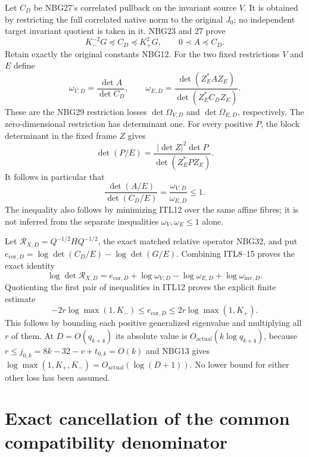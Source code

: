 \documentclass[11pt,a4paper]{article}
\begin{document}
Let $C_D$ be NBG27's correlated pullback on the invariant
source $V$. It is obtained by restricting the full correlated
native norm to the original $J_0$; no independent target
invariant quotient is taken in it. NBG23 and 27 prove
\[
 K_-^{-2}G\preceq C_D\preceq K_+^2G,\qquad
                       0\prec A\preceq C_D.       \tag{ITL12}
\]
Retain exactly the original constants NBG12. For the two
fixed restrictions $V$ and $E$ define
\[
 \omega_{V,D}=\frac{\det A}{\det C_D},\qquad
 \omega_{E,D}=\frac{\det(Z_E^*AZ_E)}
                        {\det(Z_E^*C_DZ_E)} .      \tag{ITL13}
\]
These are the NBG29 restriction losses $\det\Omega_{V,D}$
and $\det\Omega_{E,D}$, respectively. The zero-dimensional
restriction has determinant one.
For every positive $P$, the block determinant in the fixed
frame $Z$ gives
\[
 \det(P/E)=\frac{|\det Z|^2\det P}{\det(Z_E^*PZ_E)}.
                                                        \tag{ITL14}
\]
It follows in particular that
\[
 \frac{\det(A/E)}{\det(C_D/E)}
       =\frac{\omega_{V,D}}{\omega_{E,D}}\le1 .   \tag{ITL15}
\]
The inequality also follows by minimizing ITL12 over the
same affine fibres; it is not inferred from the separate
inequalities $\omega_V,\omega_E\le1$ alone.

Let $\mathscr R_{X,D}=Q^{-1/2}H Q^{-1/2}$, the exact
matched relative operator NBG32, and put
$e_{\mathrm{cor},D}=\log\det(C_D/E)-\log\det(G/E)$.
Combining ITL8--15 proves the exact identity
\[
 \boxed{\quad
 \log\det\mathscr R_{X,D}
   =e_{\mathrm{cor},D}
      +\log\omega_{V,D}-\log\omega_{E,D}
      +\log\omega_{\mathrm{inv},D} .\quad}        \tag{ITL16}
\]
Quotienting the first pair of inequalities in ITL12 proves
the explicit finite estimate
\[
 -2r\log\max(1,K_-)\le e_{\mathrm{cor},D}
                   \le2r\log\max(1,K_+).          \tag{ITL17}
\]
This follows by bounding each positive generalized eigenvalue
and multiplying all $r$ of them. At $D=O(q_{k+4})$ its absolute
value is $O_{\mathrm{actual}}(k\log q_{k+4})$, because
$r\le j_{0,k}=8k-32-v+t_{0,k}=O(k)$ and NBG13 gives
$\log\max(1,K_+,K_-)=O_{\mathrm{actual}}(\log(D+1))$.
No lower bound for either other loss has been assumed.

\section{Exact cancellation of the common compatibility denominator}
\end{document}
